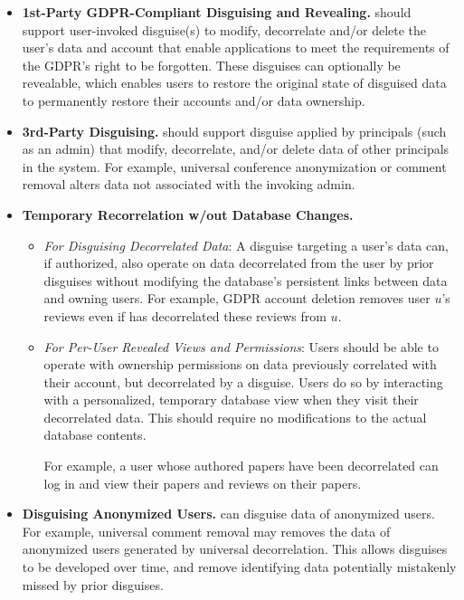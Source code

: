 \begin{itemize}
    \item\textbf{1st-Party GDPR-Compliant Disguising and Revealing.}
\sys should support user-invoked disguise(s) to modify, decorrelate and/or delete the user's data and
account that enable applications to meet the requirements of the GDPR's right to be
forgotten.
%
These disguises can optionally be revealable, which enables users to restore the original state of
        disguised data to \eg permanently restore their accounts and/or data ownership.

\item\textbf{3rd-Party Disguising.}
\sys should support disguise applied by principals (such as an admin) that modify, decorrelate, and/or delete
    data of other principals in the system. For example, universal conference anonymization or
    comment removal alters data not associated with the invoking admin.

\item\textbf{Temporary Recorrelation w/out Database Changes.}
    \begin{itemize}
        \item \emph{For Disguising Decorrelated Data}: 
        A disguise targeting a user's data can, if authorized, also operate on data decorrelated
            from the user by prior disguises without modifying the database's persistent links
            between data and owning users. For example, GDPR account deletion removes user $u$'s
            reviews even if \sys has decorrelated these reviews from $u$.

    \item \emph{For Per-User Revealed Views and Permissions}:
            Users should be able to operate with ownership permissions on data previously correlated
            with their account, but decorrelated by a disguise. Users do so by interacting with a
            personalized, temporary database view when they visit their decorrelated data. This
            should require no modifications to the actual database contents.

            For example, a user whose authored papers have been decorrelated can log in and view
            their papers and reviews on their papers.
\end{itemize}

\item\textbf{Disguising Anonymized Users.}
\sys can disguise data of anonymized users. For example, universal comment removal may removes the
        data of anonymized users generated by universal decorrelation.  This allows disguises to be
        developed over time, and remove identifying data potentially mistakenly missed by prior
        disguises.
\end{itemize}

